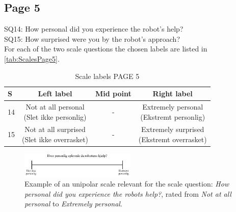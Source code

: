 \subsection{Page 5}
\noindent
SQ14: How personal did you experience the robot's help?\\%
SQ15: How surprised were you by the robot's approach?\\%
For each of the two scale questions the chosen labels are listed in \autoref{tab:ScalesPage5}. 
%
\begin{table}[H]
	\centering
\caption{Scale labels PAGE 5}
	\label{tab:ScalesPage5} 
	\begin{tabular}{l|c|c|c}
		S     & Left label & Mid point & Right label \\\hline
		14   & \makecell{Not at all personal\\(Slet ikke personlig)}  & - & \makecell{Extremely personal\\(Ekstremt personlig)}        \\\hline
		15   & \makecell{Not at all surprised\\(Slet ikke overrasket)} & - & \makecell{Extremely surprised \\(Ekstremt overrasket)}               
	\end{tabular}        
\end{table}
\noindent
%
\begin{figure}[H]
\centering
\includegraphics[width = 0.49\textwidth]{Figure/TilpassetPersonligHjaelp}
\setlength{} 
\caption{Example of an unipolar scale relevant for the scale question: \textit{How personal did you experience the robots help?}, rated from \textit{Not at all personal} to \textit{Extremely personal}.}
\label{fig:TilpassetPersonligHjaelp}
\end{figure}
\noindent
% 
